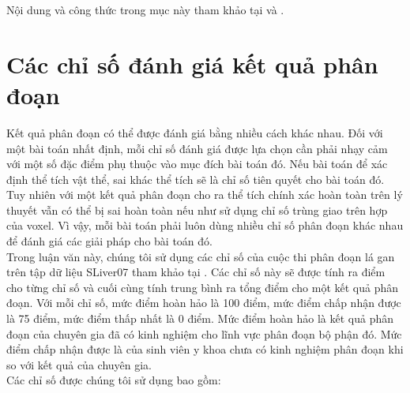 Nội dung và công thức trong mục này tham khảo tại \cite{661192} và \cite{56205}.


\section{Các chỉ số đánh giá kết quả phân đoạn}
Kết quả phân đoạn có thể được đánh giá bằng nhiều cách khác nhau. Đối với một bài toán nhất định, mỗi chỉ số đánh giá được lựa chọn cần phải nhạy cảm với một số đặc điểm phụ thuộc vào mục đích bài toán đó. Nếu bài toán để xác định thể tích vật thể, sai khác thể tích sẽ là chỉ số tiên quyết cho bài toán đó. Tuy nhiên với một kết quả phân đoạn cho ra thể tích chính xác hoàn toàn trên lý thuyết vẫn có thể bị sai hoàn toàn nếu như sử dụng chỉ số trùng giao trên hợp của voxel. Vì vậy, mỗi bài toán phải luôn dùng nhiều chỉ số phân đoạn khác nhau để đánh giá các giải pháp cho bài toán đó.\\
Trong luận văn này, chúng tôi sử dụng các chỉ số của cuộc thi phân đoạn lá gan trên tập dữ liệu SLiver07 tham khảo tại \cite{SLiver07metric}. Các chỉ số này sẽ được tính ra điểm cho từng chỉ số và cuối cùng tính trung bình ra tổng điểm cho một kết quả phân đoạn. Với mỗi chỉ số, mức điểm hoàn hảo là 100 điểm, mức điểm chấp nhận được là 75 điểm, mức điểm thấp nhất là 0 điểm. Mức điểm hoàn hảo là kết quả phân đoạn của chuyên gia đã có kinh nghiệm cho lĩnh vực phân đoạn bộ phận đó. Mức điểm chấp nhận được là của sinh viên y khoa chưa có kinh nghiệm phân đoạn khi so với kết quả của chuyên gia.\\
Các chỉ số được chúng tôi sử dụng bao gồm:
